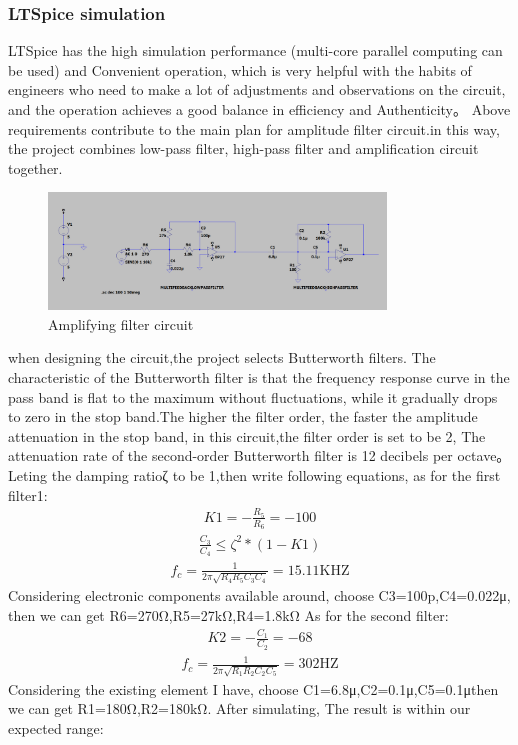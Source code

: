 \subsubsection{LTSpice simulation}
LTSpice has the high simulation performance (multi-core parallel computing can be used) and Convenient operation, which is very helpful with the habits of engineers who need to make a lot of adjustments and observations on the circuit, and the operation achieves a good balance in efficiency and Authenticity。
Above requirements contribute to the main plan for amplitude filter circuit.in this way, the project combines low-pass filter, high-pass filter and amplification circuit together.
\begin{figure}[H]
    \centering
    \includegraphics[width=0.8\textwidth]{figure/Amplifyingfiltercircuit.png}
     \caption{Amplifying filter circuit}
\end{figure}
when designing the circuit,the project selects Butterworth filters.
The characteristic of the Butterworth filter is that the frequency response curve in the pass band is flat to the maximum without fluctuations, while it gradually drops to zero in the stop band.The higher the filter order, the faster the amplitude attenuation in the stop band, in this circuit,the filter order is set to be 2, The attenuation rate of the second-order Butterworth filter is 12 decibels per octave。
Leting the damping ratioζ to be 1,then write following equations, as for the first filter1:
\begin{align}
K 1=-\frac{R_{5}}{R_{6}}=-100
\end{align}
\begin{align}
\frac{C_{3}}{C_{4}} \leq \zeta^{2} *(1-K 1)
\end{align}
\begin{align}
f_{c}=\frac{1}{2 \pi \sqrt{R_{4} R_{5} C_{3} C_{4}}}=15.11 \mathrm{KHZ}
\end{align}
Considering electronic components available around, choose C3=100p,C4=0.022μ, then we can get R6=270Ω,R5=27kΩ,R4=1.8kΩ
As for the second filter:
\begin{align}
K 2=-\frac{C_{1}}{C_{2}}=-68
\end{align}
\begin{align}
f_{c}=\frac{1}{2 \pi \sqrt{R_{1} R_{2} C_{2} C_{5}}}=302 \mathrm{HZ}
\end{align}
Considering the existing element I have, choose C1=6.8μ,C2=0.1μ,C5=0.1μthen we can get R1=180Ω,R2=180kΩ.
After simulating,  The result is within our expected range:

